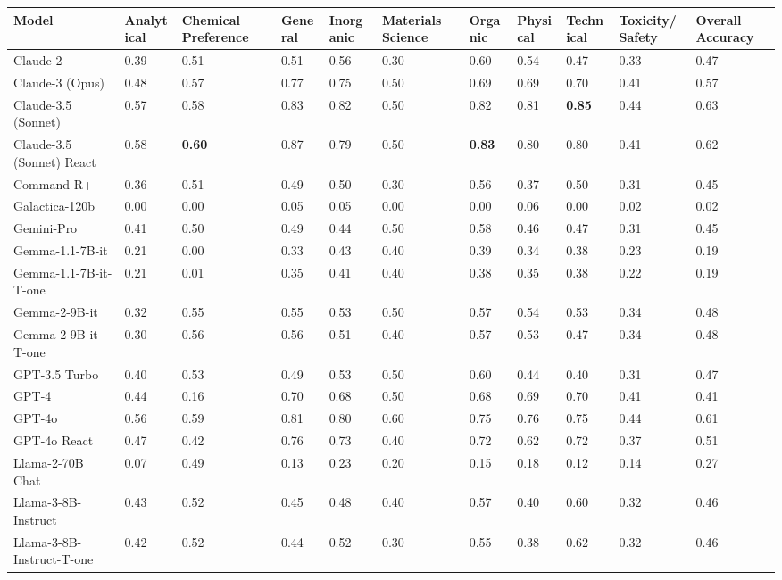 \begin{tabular}{lllllllllll}
\toprule
Model & Analytical & Chemical Preference & General & Inorganic & Materials Science & Organic & Physical & Technical & Toxicity/Safety & Overall Accuracy \\
\midrule
Claude-2 & 0.39 & 0.51 & 0.51 & 0.56 & 0.30 & 0.60 & 0.54 & 0.47 & 0.33 & 0.47 \\
Claude-3 (Opus) & 0.48 & 0.57 & 0.77 & 0.75 & 0.50 & 0.69 & 0.69 & 0.70 & 0.41 & 0.57 \\
Claude-3.5 (Sonnet) & 0.57 & 0.58 & 0.83 & 0.82 & 0.50 & 0.82 & 0.81 & \textbf{0.85} & 0.44 & 0.63 \\
Claude-3.5 (Sonnet) React & 0.58 & \textbf{0.60} & 0.87 & 0.79 & 0.50 & \textbf{0.83} & 0.80 & 0.80 & 0.41 & 0.62 \\
Command-R+ & 0.36 & 0.51 & 0.49 & 0.50 & 0.30 & 0.56 & 0.37 & 0.50 & 0.31 & 0.45 \\
Galactica-120b & 0.00 & 0.00 & 0.05 & 0.05 & 0.00 & 0.00 & 0.06 & 0.00 & 0.02 & 0.02 \\
Gemini-Pro & 0.41 & 0.50 & 0.49 & 0.44 & 0.50 & 0.58 & 0.46 & 0.47 & 0.31 & 0.45 \\
Gemma-1.1-7B-it & 0.21 & 0.00 & 0.33 & 0.43 & 0.40 & 0.39 & 0.34 & 0.38 & 0.23 & 0.19 \\
Gemma-1.1-7B-it-T-one & 0.21 & 0.01 & 0.35 & 0.41 & 0.40 & 0.38 & 0.35 & 0.38 & 0.22 & 0.19 \\
Gemma-2-9B-it & 0.32 & 0.55 & 0.55 & 0.53 & 0.50 & 0.57 & 0.54 & 0.53 & 0.34 & 0.48 \\
Gemma-2-9B-it-T-one & 0.30 & 0.56 & 0.56 & 0.51 & 0.40 & 0.57 & 0.53 & 0.47 & 0.34 & 0.48 \\
GPT-3.5 Turbo & 0.40 & 0.53 & 0.49 & 0.53 & 0.50 & 0.60 & 0.44 & 0.40 & 0.31 & 0.47 \\
GPT-4 & 0.44 & 0.16 & 0.70 & 0.68 & 0.50 & 0.68 & 0.69 & 0.70 & 0.41 & 0.41 \\
GPT-4o & 0.56 & 0.59 & 0.81 & 0.80 & 0.60 & 0.75 & 0.76 & 0.75 & 0.44 & 0.61 \\
GPT-4o React & 0.47 & 0.42 & 0.76 & 0.73 & 0.40 & 0.72 & 0.62 & 0.72 & 0.37 & 0.51 \\
Llama-2-70B Chat & 0.07 & 0.49 & 0.13 & 0.23 & 0.20 & 0.15 & 0.18 & 0.12 & 0.14 & 0.27 \\
Llama-3-8B-Instruct & 0.43 & 0.52 & 0.45 & 0.48 & 0.40 & 0.57 & 0.40 & 0.60 & 0.32 & 0.46 \\
Llama-3-8B-Instruct-T-one & 0.42 & 0.52 & 0.44 & 0.52 & 0.30 & 0.55 & 0.38 & 0.62 & 0.32 & 0.46 \\

\end{tabular}
